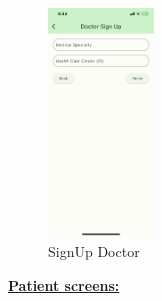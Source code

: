 \documentclass[12pt]{article}
\begin{document}
	\begin{figure}[!h]
	\centering
	\includegraphics[width=0.25\textwidth]{SignUpDoctor.png}
	\caption{SignUp Doctor}
	\label{SignUp Doctor}
\end{figure}
\newpage
\textbf{\underline{Patient screens:}}
\end{document}
